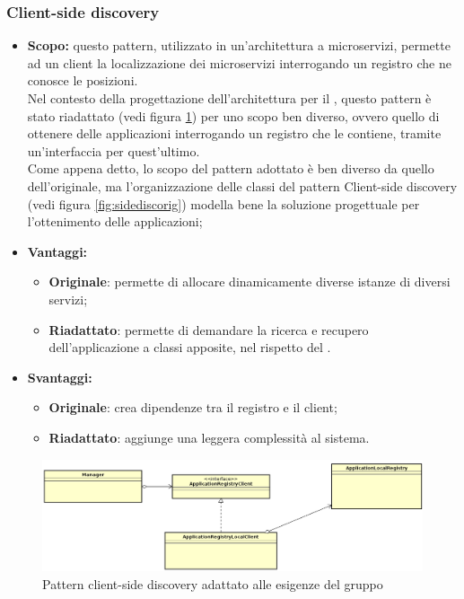      \subsubsection{Client-side discovery}\label{CS}
      \begin{itemize}
       \item \textbf{Scopo:} questo pattern, utilizzato in un'architettura a microservizi, permette ad un client la localizzazione dei microservizi interrogando un registro che ne conosce le posizioni. \\
       Nel contesto della progettazione dell'architettura per il  \PROGETTO, questo pattern è stato riadattato (vedi figura \ref{fig:sidedisc}) per uno scopo ben diverso, ovvero quello di ottenere delle applicazioni interrogando un registro che le contiene, tramite un'interfaccia per quest'ultimo. \\ Come appena detto, lo scopo del pattern adottato è ben diverso da quello dell'originale, ma l'organizzazione delle classi del pattern Client-side discovery (vedi figura \ref{fig:sidediscorig}) modella bene la soluzione progettuale per l'ottenimento delle applicazioni;
	\item \textbf{Vantaggi:}
     \begin{itemize}
	   \item \textbf{Originale}: permette di allocare dinamicamente diverse istanze di diversi servizi;
	   \item \textbf{Riadattato}: permette di demandare la ricerca e recupero dell'applicazione a classi apposite, nel rispetto del .
	  \end{itemize}
	\item \textbf{Svantaggi:}
	  \begin{itemize}
	   \item \textbf{Originale}: crea dipendenze tra il registro e il client;
	   \item \textbf{Riadattato}: aggiunge una leggera complessità al sistema.
	  \end{itemize}
	\end{itemize}
	 \begin{figure}[h]
	 	\centering
	 	\includegraphics[width=\textwidth,height=\textheight,keepaspectratio]{images/sidedisc.png}
	 	\caption{Pattern client-side discovery adattato alle esigenze del gruppo}\label{fig:sidedisc}
	 \end{figure}
